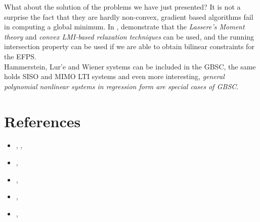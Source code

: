 What about the solution of the problems we have just presented? It is not a surprise the fact that they are hardly non-convex, gradient based algorithms fail in computing a global minimum. In \cite{cerone2021unified}, \citeauthor*{cerone2021unified} demonstrate that the \textit{Lassere's Moment theory} and \textit{convex LMI-based relaxation techniques} can be used, and the running intersection property can be used if we are able to obtain bilinear constraints for the EFPS.\\
Hammerstein, Lur'e and Wiener systems can be included in the GBSC, the same holds SISO and MIMO LTI systems and even more interesting, \textit{general polynomial nonlinear systems in regression form are special cases of GBSC}.

\section*{References}
\begin{itemize}
    \itemsep-0.3em
    \item[\Large{\ding{45}}] , \textit{}, 
    \item[\Large{\ding{45}}] \citeauthor{cerone2013bounding} \textit{}, 
    \item[\Large{\ding{45}}] \citeauthor{cerone2012computational} \textit{}, 
    \item[\Large{\ding{45}}]  \citeauthor{cerone2021unified} \textit{}, 
    \item[\Large{\ding{45}}] \citeauthor{cerone2006parameter} \textit{}, 
\end{itemize}






